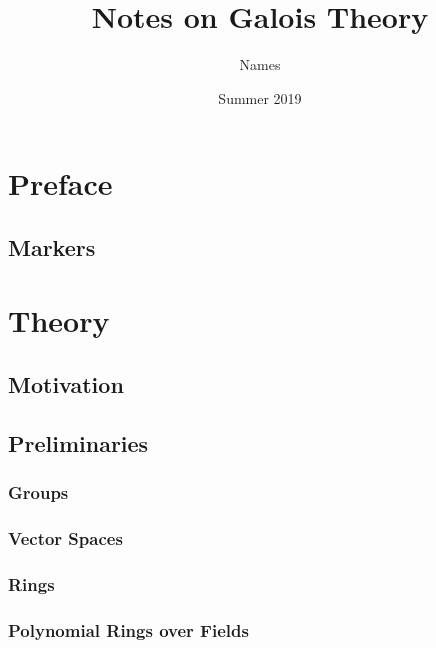 \documentclass[oneside]{book}
\theoremstyle{lemmastyle}
\theoremstyle{definitionstyle}
\theoremstyle{exercisestyle}
\theoremstyle{claimstyle}
\newcommand{\<}{\langle}
\renewcommand{\>}{\rangle}
\begin{document}
\title{Notes on Galois Theory}
\author{Names}
\date{Summer 2019}
\maketitle

\tableofcontents
\newpage

\part{Preface}
    \chapter{Markers}
        

\part{Theory}
    
    \chapter{Motivation}
        
        
    \chapter{Preliminaries}
        
        \section{Groups}
            
        
        \section{Vector Spaces}
            
        
        \section{Rings}
            
        
        \section{Polynomial Rings over Fields}
            
        
\end{document}
